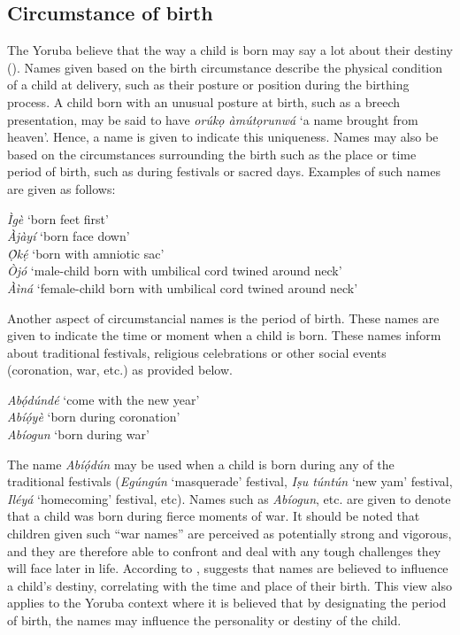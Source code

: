 \documentclass[output=paper,colorlinks,citecolor=brown]{langscibook}
\begin{document}
\subsection{Circumstance of birth}

The Yoruba believe that the way a child is born may say a lot about their destiny (\cite{Ehineni2019}). Names given based on the birth circumstance describe the physical condition of a child at delivery, such as their posture or position during the birthing process. A child born with an unusual posture at birth, such as a breech presentation, may be said to have \textit{orúkọ àmútọrunwá} `a name brought from heaven'. Hence, a name is given to indicate this uniqueness. Names may also be based on the circumstances surrounding the birth such as the place or time period of birth, such as during festivals or sacred days. Examples of such names are given as follows:

\ea \label{Circumstance1}
\begin{xlist}
\ex	\textit{Ìgè} 	    ‘born feet first’\\
\ex	\textit{Àjàyí}		‘born face down’\\
\ex	\textit{Ọ̀kẹ́}		‘born with amniotic sac’\\
\ex	\textit{Òjó}		‘male-child born with umbilical cord twined around neck’\\
\ex	\textit{Àìná} 	 	‘female-child born with umbilical cord twined around neck’\\
\end{xlist}
\z

Another aspect of circumstancial names is the period of birth. These names are given to indicate the time or moment when a child is born. These names inform about traditional festivals, religious celebrations or other social events (coronation, war, etc.) as provided below.

\ea \label{Circumstance2}
\begin{xlist}
\ex	\textit{Abọ́dúndé}         ‘come with the new year’\\
\ex	\textit{Abíọ́yè}		‘born during coronation’\\
\ex	\textit{Abíogun}	‘born during war’\\
\end{xlist}
\z

The name \textit{Abíọ́dún} may be used when a child is born during any of the traditional festivals (\textit{Egúngún} `masquerade' festival, \textit{Iṣu túntún} `new yam' festival, \textit{Iléyá} `homecoming' festival, etc). Names such as \textit{Abíogun}, etc. are given to denote that a child was born during fierce moments of war. It should be noted that children given such ``war names'' are perceived as potentially strong and vigorous, and they are therefore able to confront and deal with any tough challenges they will face later in life. According to \citet[364]{Blum1997}, suggests that names are believed to influence a child's destiny, correlating with the time and place of their birth. This view also applies to the Yoruba context where it is believed that by designating the period of birth, the names may influence the personality or destiny of the child.
\end{document}
